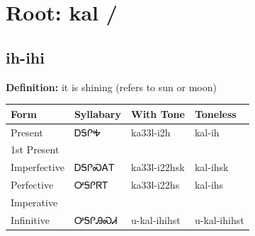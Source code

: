\documentclass{article}%
\begin{document}
%
\normalsize%
\section*{Root: kal / }%
\subsection*{ih-ihi}%
\textbf{Definition: }%
it is shining (refers to sun or moon)%
\\[0.5em]%
\begin{tabular}{|l|l|l|l|}%
\hline%
\textbf{Form}&\textbf{Syllabary}&\textbf{With Tone}&\textbf{Toneless}\\%
\hline%
Present&ᎠᎦᎵᎭ&ka33l{-}i2h&kal{-}ih\\%
1st Present&&&\\%
Imperfective&ᎠᎦᎵᏍᎪᎢ&ka33l{-}i22hsk&kal{-}ihsk\\%
Perfective&ᎤᎦᎵᏒᎢ&ka33l{-}i22hs&kal{-}ihs\\%
Imperative&&&\\%
Infinitive&ᎤᎦᎵᎯᏍᏗ&u{-}kal{-}ihihst&u{-}kal{-}ihihst\\%
\hline%
\end{tabular}%
\\[1em]%
\end{document}
